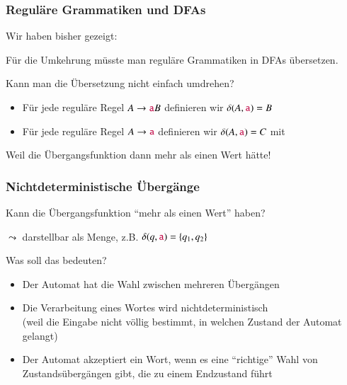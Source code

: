 \documentclass[aspectratio=1610,onlymath]{beamer}
\begin{document}
\begin{frame}\frametitle{Reguläre Grammatiken und DFAs}

Wir haben bisher gezeigt:


Für die Umkehrung müsste man reguläre Grammatiken in DFAs übersetzen.
\bigskip

Kann man die Übersetzung nicht einfach umdrehen?
\begin{itemize}
\item Für jede reguläre Regel $A\to\mathtt{\textcolor{purple}{a}}B$ definieren wir $\delta(A,\mathtt{\textcolor{purple}{a}})=B$
\item Für jede reguläre Regel $A\to\mathtt{\textcolor{purple}{a}}$ definieren wir $\delta(A,\mathtt{\textcolor{purple}{a}})=C$ mit 
\end{itemize}
\pause

\alert{Weil die Übergangsfunktion dann mehr als einen Wert hätte!}\medskip


\end{frame}


\begin{frame}\frametitle{Nichtdeterministische Übergänge}

Kann die Übergangsfunktion "`mehr als einen Wert"' haben?
\medskip

$\leadsto$ darstellbar als Menge, z.B. $\delta(q,\mathtt{\textcolor{purple}{a}}) =\{q_1, q_2\}$
\bigskip

Was soll das bedeuten?
\begin{itemize}
\item Der Automat hat die Wahl zwischen mehreren Übergängen
\item Die Verarbeitung eines Wortes wird \alert{nichtdeterministisch}\\
(weil die Eingabe nicht völlig bestimmt, in welchen Zustand der Automat gelangt)
\item Der Automat akzeptiert ein Wort, wenn es eine "`richtige"' Wahl von Zustandsübergängen gibt, die zu einem Endzustand führt
\end{itemize}


\end{frame}
\end{document}
